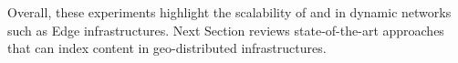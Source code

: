 
\begin{asparadesc}
  \item[Overall,] these experiments highlight the scalability of \NAME
    and \NAMEC in dynamic networks such as Edge infrastructures. Next
    Section reviews state-of-the-art approaches that can index content
    in geo-distributed infrastructures.
\end{asparadesc}



